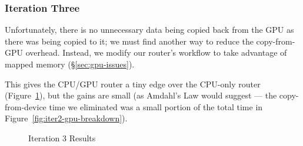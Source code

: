 \subsubsection{Iteration Three}

Unfortunately, there is no unnecessary data being copied back from the GPU as
there was being copied to it; we must find another way to reduce the
copy-from-GPU overhead. Instead, we modify our router's workflow to take
advantage of mapped memory (\S\ref{sec:gpu-issues}).

This gives the CPU/GPU router a tiny edge over the CPU-only router
(Figure~\ref{fig:iter3}), but the gains are small (as Amdahl's Law would
suggest --- the copy-from-device time we eliminated was a small portion of the
total time in Figure~\ref{fig:iter2-gpu-breakdown}).


\begin{figure}
    \centering

	\medskip

   	\medskip

    \caption{Iteration 3 Results}
	\label{fig:iter3}
\end{figure}


